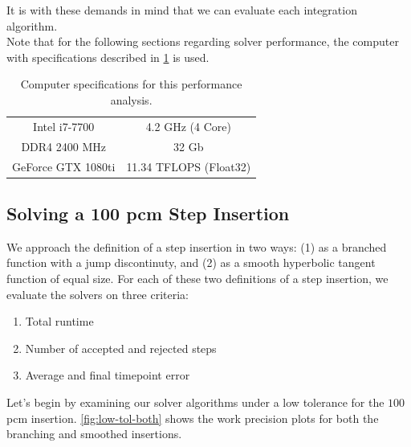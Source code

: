 \documentclass[review,onefignum,onetabnum]{siamart171218}
\begin{document}
It is with these demands in mind that we can evaluate each integration algorithm.\\

Note that for the following sections regarding solver performance, the computer
with specifications described in \cref{tab:computer-specs} is used.

\begin{table}[htb]
  \begin{center}
    \begin{tabular}{c|c}
      Intel i7-7700&4.2 GHz (4 Core)\\
      DDR4 2400 MHz&32 Gb\\
      GeForce GTX 1080ti&11.34 TFLOPS (Float32)\\
    \end{tabular}
  \end{center}
  \caption{Computer specifications for this performance analysis.}
  \label{tab:computer-specs}
\end{table}

\subsection{Solving a 100 pcm Step Insertion}

We approach the definition of a step insertion in two ways: (1) as a branched
function with a jump discontinuty, and (2) as a smooth hyperbolic tangent function
of equal size. For each of these two definitions of a step insertion, we
evaluate the solvers on three criteria: \\


\begin{enumerate}
  \item Total runtime
  \item Number of accepted and rejected steps
  \item Average and final timepoint error
\end{enumerate}

Let's begin by examining our solver algorithms under a low tolerance for the $100$
pcm insertion. \cref{fig:low-tol-both} shows the work precision plots for
both the branching and smoothed insertions.
\end{document}

